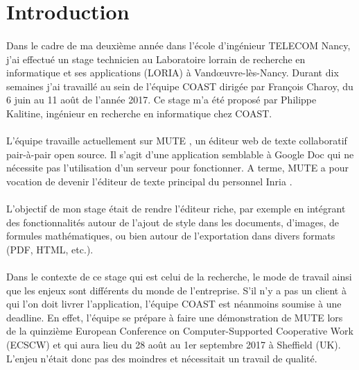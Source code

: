 \documentclass[12pt]{article}
\begin{document}
\section*{Introduction}
\paragraph{}
Dans le cadre de ma deuxième année dans l'école d'ingénieur TELECOM Nancy, j'ai effectué un stage technicien au Laboratoire lorrain de recherche en informatique et ses applications (LORIA) \cite{loria} à Vand\oe{}uvre-lès-Nancy. Durant dix semaines j'ai travaillé au sein de l'équipe COAST \cite{coast} dirigée par François Charoy, du 6 juin au 11 août de l'année 2017. Ce stage m'a été proposé par Philippe Kalitine, ingénieur en recherche en informatique chez COAST.

\paragraph{}
L'équipe travaille actuellement sur MUTE \cite{mute}, un éditeur web de texte collaboratif pair-à-pair open source. Il s'agit d'une application semblable à Google Doc qui ne nécessite pas l'utilisation d'un serveur pour fonctionner. A terme, MUTE a pour vocation de devenir l'éditeur de texte principal du personnel Inria \cite{inria}.

\paragraph{}
L'objectif de mon stage était de rendre l'éditeur riche, par exemple en intégrant des fonctionnalités autour de l'ajout de style dans les documents, d'images, de formules mathématiques, ou bien autour de l'exportation dans divers formats (PDF, HTML, etc.).

\paragraph{}
Dans le contexte de ce stage qui est celui de la recherche, le mode de travail ainsi que les enjeux sont différents du monde de l'entreprise. S'il n'y a pas un client à qui l'on doit livrer l'application, l'équipe COAST est néanmoins soumise à une deadline. En effet, l'équipe se prépare à faire une démonstration de MUTE lors de la quinzième European Conference on Computer-Supported Cooperative Work (ECSCW) \cite{ecscw} et qui aura lieu du 28 août au 1er septembre 2017 à Sheffield (UK). L'enjeu n'était donc pas des moindres et nécessitait un travail de qualité.
\end{document}

